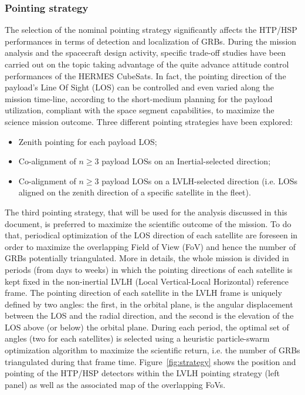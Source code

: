 \documentclass[]{spie}  %
\begin{document}
\subsubsection{Pointing strategy}
\label{sec:po_strat}
The selection of the nominal pointing strategy significantly affects the HTP/HSP performances in terms of detection and localization of GRBs. During the mission analysis and the spacecraft design activity, specific trade-off studies have been carried out on the topic taking advantage of the quite advance attitude control performances of the HERMES CubeSats. In fact, the pointing direction of the payload’s Line Of Sight (LOS) can be controlled and even varied along the mission time-line, according to the short-medium planning for the payload utilization, compliant with the space segment capabilities, to maximize the science mission outcome. 
Three different pointing strategies have been explored:
\begin{itemize} 
\item Zenith pointing for each payload LOS; 
\item Co-alignment of $n\geq3$ payload LOSs on an Inertial-selected direction; 
\item Co-alignment of $n\geq3$ payload LOSs on a LVLH-selected direction (i.e. LOSs aligned on the zenith direction of a specific satellite in the fleet).
\end{itemize} 

The third pointing strategy, that will be used for the analysis discussed in this document, is preferred to maximize the scientific outcome of the mission. To do that, periodical optimization of the LOS direction of each satellite are foreseen in order to maximize the overlapping Field of View (FoV) and hence the number of GRBs potentially triangulated. More in details, the whole mission is divided in periods (from days to weeks) in which the pointing directions of each satellite is kept fixed in the non-inertial LVLH (Local Vertical-Local Horizontal) reference frame. The pointing direction of each satellite in the LVLH frame is uniquely defined by two angles: the first, in the orbital plane, is the angular displacement between the LOS and the radial direction, and the second is the elevation of the LOS above (or below) the orbital plane. During each period, the optimal set of angles (two for each satellites) is selected using a heuristic particle-swarm optimization algorithm to maximize the scientific return, i.e. the number of GRBs triangulated during that frame time. Figure~\ref{fig:strategy} shows the position and pointing of the HTP/HSP detectors within the LVLH pointing strategy (left panel) as well as the associated map of the overlapping FoVs.  
\end{document}
